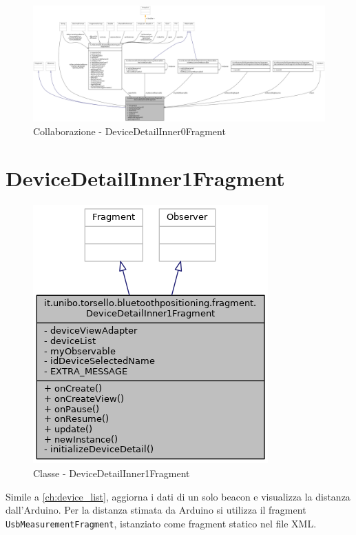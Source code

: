 \begin{figure}[ph]
	\centering
	\includegraphics[width=1.55\linewidth,angle=90]{img/uml/class/classit_1_1unibo_1_1torsello_1_1bluetoothpositioning_1_1fragment_1_1DeviceDetailInner0Fragment__coll__graph.png}
	\caption{Collaborazione - DeviceDetailInner0Fragment}
\end{figure}

\newpage
\section{DeviceDetailInner1Fragment}
\begin{figure}[ph]
	\centering
	\includegraphics[width=0.6\linewidth]{img/uml/class/classit_1_1unibo_1_1torsello_1_1bluetoothpositioning_1_1fragment_1_1DeviceDetailInner1Fragment__inherit__graph.png}
	\caption{Classe - DeviceDetailInner1Fragment}
\end{figure}

Simile a \ref{ch:device_list}, aggiorna i dati di un solo beacon e visualizza la distanza dall'Arduino. Per la distanza stimata da Arduino si utilizza il fragment \texttt{UsbMeasurementFragment}, istanziato come fragment statico nel file XML.


